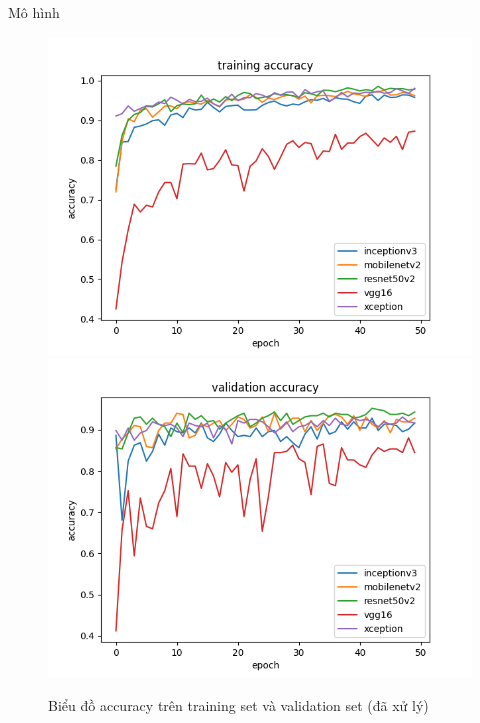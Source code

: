 \documentclass{beamer}
\begin{document}
\begin{frame}[allowframebreaks]{Mô hình}
	\begin{figure}[H]
		\centering
		\includegraphics[scale=0.3]{images/accuracy.png}
		\includegraphics[scale=0.3]{images/val_accuracy.png}
		\caption{Biểu đồ accuracy trên training set và validation set (đã xử lý)}
	\end{figure}


\end{frame}
\end{document}
